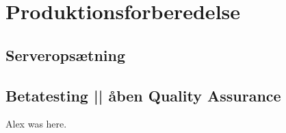 \section{Produktionsforberedelse \label{sec:produktionsforberedelse}}
\subsection{Serveropsætning}
\subsection{Betatesting || åben Quality Assurance}
Alex was here.